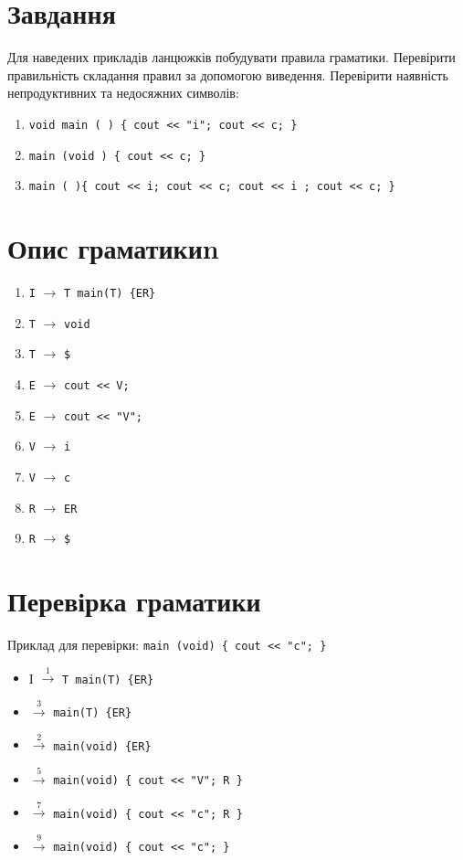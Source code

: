 \section{Завдання}
Для наведених прикладів ланцюжків побудувати правила граматики.
Перевірити правильність складання правил за допомогою виведення.
Перевірити наявність непродуктивних та недосяжних символів:

\begin{enumerate}
    \item \verb|void main ( ) { cout << "i"; cout << c; }|
    \item \verb|main (void ) { cout << c; }|
    \item \verb|main ( ){ cout << i; cout << c; cout << i ; сout << c; }|
\end{enumerate}

\section{Опис граматикиn}
\begin{enumerate}
    \item  \verb|I| $\to$ \verb|T main(T) {ER}|
    \item  \verb|T| $\to$ \verb|void|
    \item  \verb|T| $\to$ \verb|$|
    \item  \verb|E| $\to$ \verb|cout << V;|
    \item  \verb|E| $\to$ \verb|cout << "V";|
    \item  \verb|V| $\to$ \verb|i|
    \item  \verb|V| $\to$ \verb|c|
    \item  \verb|R| $\to$ \verb|ER|
    \item  \verb|R| $\to$ \verb|$|
\end{enumerate}


\newpage
\section{Перевірка граматики}
Приклад для перевірки: \verb|main (void) { cout << "c"; }|
\begin{itemize}
    \item[]  I $\xrightarrow{1}$ \verb|T main(T) {ER}|
    \item[]  $\xrightarrow{3}$ \verb|main(T) {ER}|
    \item[]  $\xrightarrow{2}$ \verb|main(void) {ER}|
    \item[]  $\xrightarrow{5}$ \verb|main(void) { cout << "V"; R }|
    \item[]  $\xrightarrow{7}$ \verb|main(void) { cout << "c"; R }|
    \item[]  $\xrightarrow{9}$ \verb|main(void) { cout << "c"; }|
\end{itemize}

